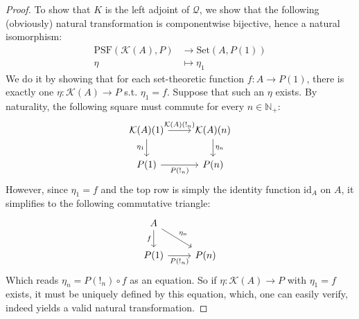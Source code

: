 \documentclass{article}
\theoremstyle{remark}
\theoremstyle{definition}
\newcommand{\N}{\mathbb N}
\newcommand{\Set}{\mathrm{Set}}
\newcommand{\PSF}{\mathrm{PSF}}
\newcommand{\id}{\mathrm{id}}
\newcommand{\K}{\mathcal K}
\newcommand{\Q}{\mathcal Q}
\begin{document}
	\begin{proof}
		To show that $K$ is the left adjoint of $\Q$, we show that the following (obviously) natural transformation is componentwise bijective, hence a natural isomorphism:
		\begin{align*}
			\PSF(\K(A), P)&\to\Set(A, P(1))\\
			\eta&\mapsto\eta_1
		\end{align*}
		We do it by showing that for each set-theoretic function $f:A\to P(1)$, there is exactly one $\eta:\K(A)\to P$ s.t. $\eta_1=f$.
		Suppose that such an $\eta$ exists. By naturality, the following square must commute for every $n\in\N_+$:
		\[\begin{tikzcd}
			\K(A)(1)\arrow{r}{\K(A)(!_n)}\arrow{d}[swap]{\eta_1}&\K(A)(n)\arrow{d}{\eta_n}\\
			P(1)\arrow{r}[swap]{P(!_n)}&P(n)
		\end{tikzcd}\]
		However, since $\eta_1=f$ and the top row is simply the identity function $\id_A$ on $A$, it simplifies to the following commutative triangle:
		\[\begin{tikzcd}
			A\arrow{d}[swap]{f}\arrow{dr}{\eta_n}\\
			P(1)\arrow{r}[swap]{P(!_n)}&P(n)
		\end{tikzcd}\]
		Which reads $\eta_n=P(!_n)\circ f$ as an equation. So if $\eta:\K(A)\to P$ with $\eta_1=f$ exists, it must be uniquely defined by this equation, which, one can easily verify, indeed yields a valid natural transformation.
		

\end{proof}
\end{document}
